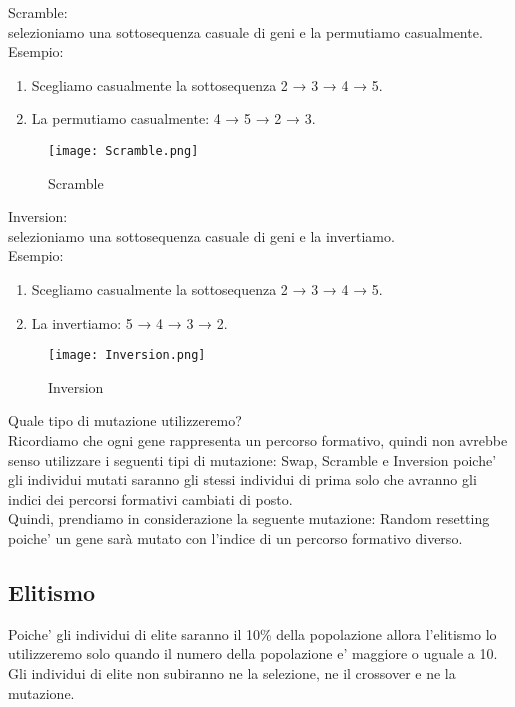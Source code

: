 \documentclass[10pt,a4paper]{article}
\begin{document}
    Scramble:\\
    selezioniamo una sottosequenza casuale di geni e la permutiamo casualmente.
    Esempio:\\
    \begin{enumerate}
      \item Scegliamo casualmente la sottosequenza 2 → 3 → 4 → 5.
      \item La permutiamo casualmente: 4 → 5 → 2 → 3.
    \end{enumerate}
    \begin{figure}[h!]
      \centering
      \caption{Scramble}
      \texttt{[image: Scramble.png]}
      \label{Scramble}
    \end{figure}
     
    Inversion:\\
    selezioniamo una sottosequenza casuale di geni e la invertiamo.\\
    Esempio:\\
    \begin{enumerate}
      \item Scegliamo casualmente la sottosequenza 2 → 3 → 4 → 5.
      \item La invertiamo: 5 → 4 → 3 → 2.
    \end{enumerate}
    \begin{figure}[h!]
      \centering
      \caption{Inversion}
      \texttt{[image: Inversion.png]}
      \label{Inversion}
    \end{figure}
    
    Quale tipo di mutazione utilizzeremo?\\
    Ricordiamo che ogni gene rappresenta un percorso formativo, quindi non avrebbe senso utilizzare i 
    seguenti tipi di mutazione: Swap, Scramble e Inversion poiche' gli individui mutati saranno gli 
    stessi individui di prima solo che avranno gli indici dei percorsi formativi cambiati di posto.\\
    Quindi, prendiamo in considerazione la seguente mutazione: Random resetting poiche' un gene sarà 
    mutato con l'indice di un percorso formativo diverso.
    
    \subsection{Elitismo}
    \label{elitismoSubsection}
    Poiche' gli individui di elite saranno il 10\% della popolazione allora l'elitismo lo utilizzeremo 
    solo quando il numero della popolazione e' maggiore o uguale a 10. Gli individui di elite non 
    subiranno ne la selezione, ne il crossover e ne la mutazione.
	
\end{document}
